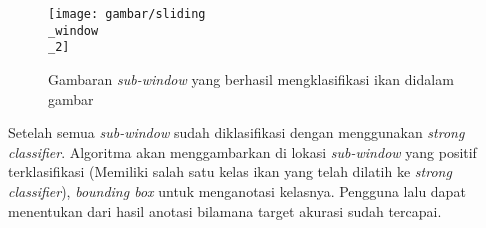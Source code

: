 \begin{figure}[H]
  \centering{}
	\texttt{[image: gambar/sliding\\\_window\\\_2]}
  \caption{Gambaran \textit{sub-window} yang berhasil mengklasifikasi ikan didalam gambar}
\end{figure}

Setelah semua \textit{sub-window} sudah diklasifikasi dengan menggunakan 
\emph{strong classifier}. Algoritma akan menggambarkan di lokasi \textit{sub-window} 
yang positif terklasifikasi (Memiliki salah satu kelas ikan yang telah dilatih ke \emph{strong classifier}), 
\emph{bounding box} untuk menganotasi kelasnya. Pengguna lalu dapat menentukan 
dari hasil anotasi bilamana target akurasi sudah tercapai.


